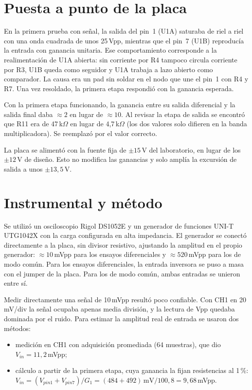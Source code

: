 \documentclass[journal,a4paper]{IEEEtran}
\begin{document}
\section{Puesta a punto de la placa}

En la primera prueba con señal, la salida del pin~1 (U1A) saturaba de riel a riel con una onda cuadrada de unos 25\,Vpp, mientras que el pin~7 (U1B) reproducía la entrada con ganancia unitaria. Ese comportamiento corresponde a la realimentación de U1A abierta: sin corriente por R4 tampoco circula corriente por R3, U1B queda como seguidor y U1A trabaja a lazo abierto como comparador. La causa era un pad sin soldar en el nodo que une el pin~1 con R4 y R7. Una vez resoldado, la primera etapa respondió con la ganancia esperada.

Con la primera etapa funcionando, la ganancia entre su salida diferencial y la salida final daba $\approx 2$ en lugar de $\approx 10$. Al revisar la etapa de salida se encontró que R11 era de 47\,k$\Omega$ en lugar de 4,7\,k$\Omega$ (los dos valores solo difieren en la banda multiplicadora). Se reemplazó por el valor correcto.

La placa se alimentó con la fuente fija de $\pm 15$\,V del laboratorio, en lugar de los $\pm 12$\,V de diseño. Esto no modifica las ganancias y solo amplía la excursión de salida a unos $\pm 13{,}5$\,V.

\section{Instrumental y método}

Se utilizó un osciloscopio Rigol DS1052E y un generador de funciones UNI-T UTG1042X con la carga configurada en alta impedancia. El generador se conectó directamente a la placa, sin divisor resistivo, ajustando la amplitud en el propio generador: $\approx 10$\,mVpp para los ensayos diferenciales y $\approx 520$\,mVpp para los de modo común. Para los ensayos diferenciales, la entrada inversora se puso a masa con el jumper de la placa. Para los de modo común, ambas entradas se unieron entre sí.

Medir directamente una señal de 10\,mVpp resultó poco confiable. Con CH1 en 20\,mV/div la señal ocupaba apenas media división, y la lectura de Vpp quedaba dominada por el ruido. Para estimar la amplitud real de entrada se usaron dos métodos:
\begin{itemize}
\item medición en CH1 con adquisición promediada (64 muestras), que dio $V_{in} = 11{,}2$\,mVpp;
\item cálculo a partir de la primera etapa, cuya ganancia la fijan resistencias al 1\,\%: $V_{in} = (V_{pin1}+V_{pin7})/G_1 = (484+492)\,\text{mV}/100{,}8 = 9{,}68$\,mVpp.
\end{itemize}
\end{document}
